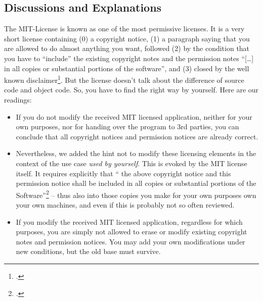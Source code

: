 \subsection{Discussions and Explanations}

The MIT-License is known as one of the most permissive licenses. It is a very
short license containing (0) a copyright notice, (1) a paragraph saying that you
are allowed to do almost anything you want, followed (2) by the condition that
you have to \enquote{include} the existing copyright notes and the permission
notes \enquote{[\ldots] in all copies or substantial portions of the software},
and (3) closed by the well known disclaimer\footcite[cf.][\nopage
wp]{MitLicense2012a}. But the license doesn't talk about the difference of
source code and object code. So, you have to find the right way by yourself.
Here are our readings:

\label{sec:MitDiscussions}
\begin{itemize}
  \item If you do not modify the received MIT licensed application, neither for
  your own purposes, nor for handing over the program to 3rd parties, you can
  conclude that all copyright notices and permission notices are already
  correct.
  \item Nevertheless, we added the hint not to modify these licensing elements
  in the context of the use case \emph{used by yourself}. This is evoked by the
  MIT license itself. It requires explicitly that \enquote{ the above copyright
  notice and this permission notice shall be included in all copies or
  substantial portions of the Software}\footcite[cf.][\nopage
  wp]{MitLicense2012a} -- thus also into those copies you make for your own
  purposes own your own machines, and even if this is probably not so often
  reviewed.
  \item If you modify the received MIT licensed application, regardless for
  which purposes, you are simply not allowed to erase or modify existing
  copyright notes and permission notices. You may add your own modifications
  under new conditions, but the old base must survive.
\end{itemize}

%

